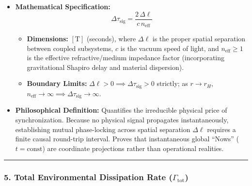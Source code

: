 \documentclass[
]{article}
\providecommand{\tightlist}{%
  \setlength{\itemsep}{0pt}\setlength{\parskip}{0pt}}
\begin{document}
\begin{itemize}
\tightlist
\item
  \textbf{Mathematical Specification:}
  \[\Delta\tau_{\mathrm{sig}} = \frac{2 \, \Delta\ell}{c \, n_{\mathrm{eff}}}\]

  \begin{itemize}
  \tightlist
  \item
    \textbf{Dimensions:} \([\text{T}]\) (seconds), where \(\Delta\ell\)
    is the proper spatial separation between coupled subsystems, \(c\)
    is the vacuum speed of light, and \(n_{\mathrm{eff}} \ge 1\) is the
    effective refractive/medium impedance factor (incorporating
    gravitational Shapiro delay and material dispersion).
  \item
    \textbf{Boundary Limits:}
    \(\Delta\ell > 0 \implies \Delta\tau_{\mathrm{sig}} > 0\) strictly;
    as \(r \to r_H\),
    \(n_{\mathrm{eff}} \to \infty \implies \Delta\tau_{\mathrm{sig}} \to \infty\).
  \end{itemize}
\item
  \textbf{Philosophical Definition:} Quantifies the irreducible physical
  price of synchronization. Because no physical signal propagates
  instantaneously, establishing mutual phase-locking across spatial
  separation \(\Delta\ell\) requires a finite causal round-trip
  interval. Proves that instantaneous global ``Nows''
  (\(t = \text{const}\)) are coordinate projections rather than
  operational realities.
\end{itemize}

\begin{center}\rule{0.5\linewidth}{0.5pt}\end{center}

\subsubsection{\texorpdfstring{5. Total Environmental Dissipation Rate
(\(\Gamma_{\mathrm{tot}}\))}{5. Total Environmental Dissipation Rate (\textbackslash Gamma\_\{\textbackslash mathrm\{tot\}\})}}\label{total-environmental-dissipation-rate-gamma_mathrmtot}
\end{document}
